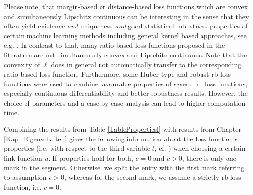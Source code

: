 \documentclass[10pt]{article}
\begin{document}
Please note, that margin-based or distance-based loss functions which are convex and simultaneously Lipschitz continuous can be interesting in the sense that they often yield existence \emph{and} uniqueness \emph{and} good statistical robustness properties of certain machine learning methods including general kernel based approaches, see e.g. \cite{ChristmannVanMessemSteinwart2009}. 
In contrast to that, many ratio-based loss functions proposed in the literature are not simultaneously convex and Lipschitz continuous. 
Note that the convexity of $\ell$ does in general not automatically transfer to the corresponding  ratio-based loss function.
Furthermore, some Huber-type and robust rb loss functions were used to combine favourable properties of several rb loss functions, especially continuous differentiability and better robustness results. 
However, the choice of parameters and a case-by-case analysis can lead to higher computation time.\par 
Combining the results from Table \ref{TablePropertiesl} with results from Chapter \ref{Kap_Eigenschaften} gives the following information about the loss function's properties  (i.e. with respect to the third variable $t$, cf. \cite[Chapter 2.2]{SC08})  when choosing a certain link function $u$.
If properties hold for both, $c = 0$ and $c > 0$, there is only one mark in the segment.
Otherwise, we split the entry with the first mark referring to assumption $c > 0$, whereas for the second mark, we assume a strictly rb loss function, i.e. $c = 0$. 
\end{document}
